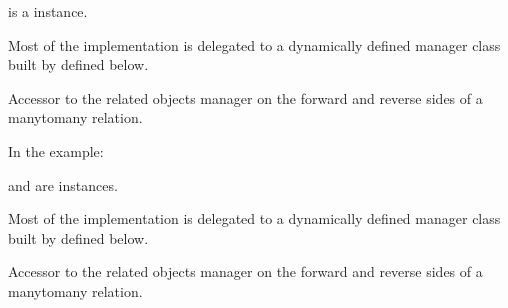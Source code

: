 \documentclass[letterpaper,10pt,french]{sphinxmanual}
\begin{document}
\begin{fulllineitems}
\begin{fulllineitems}
\sphinxAtStartPar
{} is a  instance.

\sphinxAtStartPar
Most of the implementation is delegated to a dynamically defined manager
class built by  defined below.

\end{fulllineitems}


\begin{fulllineitems}
\label{\detokenize{main/model:main.models.Etudiant.seances_presents}}
\pysigstartsignatures
{}
\pysigstopsignatures
\sphinxAtStartPar
Accessor to the related objects manager on the forward and reverse sides of
a many\sphinxhyphen{}to\sphinxhyphen{}many relation.

\sphinxAtStartPar
In the example:

\begin{sphinxVerbatim}[commandchars=\\\{\}]
 
       
\end{sphinxVerbatim}

\sphinxAtStartPar
{} and  are 
instances.

\sphinxAtStartPar
Most of the implementation is delegated to a dynamically defined manager
class built by  defined below.

\end{fulllineitems}


\begin{fulllineitems}
\label{\detokenize{main/model:main.models.Etudiant.semestres}}
\pysigstartsignatures
{}
\pysigstopsignatures
\sphinxAtStartPar
Accessor to the related objects manager on the forward and reverse sides of
a many\sphinxhyphen{}to\sphinxhyphen{}many relation.


\end{fulllineitems}
\end{fulllineitems}
\end{document}
